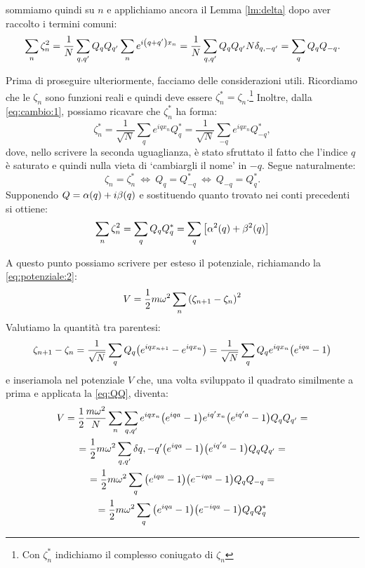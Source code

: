        sommiamo quindi su $n$ e applichiamo ancora il Lemma \ref{lm:delta} dopo aver raccolto i termini comuni: $$\sum_n\zeta_n^2=\frac{1}{N}\sum_{q,q'}Q_qQ_{q'}\sum_ne^{i\qty(q+q')x_n}=\frac{1}{N}\sum_{q,q'}Q_qQ_{q'}N\delta_{q,-q'}=\sum_qQ_qQ_{-q}.$$
        \par Prima di proseguire ulteriormente, facciamo delle considerazioni utili. Ricordiamo che le $\zeta_n$ sono funzioni reali e quindi deve essere $\zeta_n^*=\zeta_n$.\footnote{Con $\zeta_n^*$ indichiamo il complesso coniugato di $\zeta_n$} Inoltre, dalla \eqref{eq:cambio:1}, possiamo ricavare che $\zeta_n^*$ ha forma: $$\zeta_n^*=\frac{1}{\sqrt{N}}\sum_qe^{iqx_n}Q_q^*=\frac{1}{\sqrt{N}}\sum_{-q}e^{iqx_n}Q_{-q}^*,$$ dove, nello scrivere la seconda uguaglianza, \`e stato sfruttato il fatto che l'indice $q$ \`e saturato e quindi nulla vieta di `cambiargli il nome' in $-q$. Segue naturalmente:
        \begin{equation}
            \zeta_n=\zeta_n^*\ \iff\ Q_q=Q_{-q}^*\ \iff\ Q_{-q}=Q_q^*.
            \label{eq:QQ}
        \end{equation}
        Supponendo $Q=\alpha\qty(q)+i\beta\qty(q)$ e sostituendo quanto trovato nei conti precedenti si ottiene:
        \begin{equation}
            \sum_n\zeta_n^2=\sum_qQ_qQ_q^*=\sum_q\qty[\alpha^2\qty(q)+\beta^2\qty(q)]
            \label{eq:sommazetaquadro}
        \end{equation}
        \par A questo punto possiamo scrivere per esteso il potenziale, richiamando la \eqref{eq:potenziale:2}:
            $$V=\frac{1}{2}m\omega^2\sum_n\qty(\zeta_{n+1}-\zeta_n)^2$$
        Valutiamo la quantit\`a tra parentesi:
            $$\zeta_{n+1}-\zeta_n=\frac{1}{\sqrt{N}}\sum_qQ_q\qty(e^{iqx_{n+1}}-e^{iqx_n})=\frac{1}{\sqrt{N}}\sum_qQ_qe^{iqx_n}\qty(e^{iqa}-1)$$
        e inseriamola nel potenziale $V$ che, una volta sviluppato il quadrato similmente a prima e applicata la \eqref{eq:QQ}, diventa:
        \begin{multline*}
            V=\frac{1}{2}\frac{m\omega^2}{N}\sum_n\sum_{q,q'}e^{iqx_n}\qty(e^{iqa}-1)e^{iq'x_n}\bigl(e^{iq'a}-1\bigr)Q_qQ_{q'}=\\=\frac{1}{2}m\omega^2\sum_{q,q'}\delta{q,-q'}\qty(e^{iqa}-1)\bigl(e^{iq'a}-1\bigr)Q_qQ_{q'}=\\=\frac{1}{2}m\omega^2\sum_q\qty(e^{iqa}-1)\qty(e^{-iqa}-1)Q_qQ_{-q}=\\=\frac{1}{2}m\omega^2\sum_q\qty(e^{iqa}-1)\qty(e^{-iqa}-1)Q_qQ_q^*
        \end{multline*}
